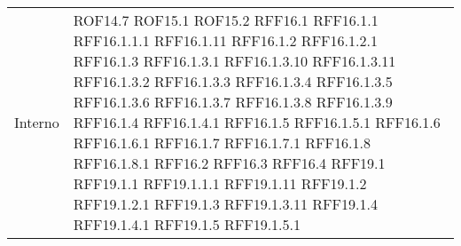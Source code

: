 \begin{longtable}{p{2.5cm}!{\VRule[1pt]}p{2.5cm}}
	Interno & ROF14.7 \newline ROF15.1 \newline ROF15.2 \newline RFF16.1 \newline RFF16.1.1 \newline RFF16.1.1.1 \newline RFF16.1.11 \newline RFF16.1.2 \newline RFF16.1.2.1 \newline RFF16.1.3 \newline RFF16.1.3.1 \newline RFF16.1.3.10 \newline RFF16.1.3.11 \newline RFF16.1.3.2 \newline RFF16.1.3.3 \newline RFF16.1.3.4 \newline RFF16.1.3.5 \newline RFF16.1.3.6 \newline RFF16.1.3.7 \newline RFF16.1.3.8 \newline RFF16.1.3.9 \newline RFF16.1.4 \newline RFF16.1.4.1 \newline RFF16.1.5 \newline RFF16.1.5.1 \newline RFF16.1.6 \newline RFF16.1.6.1 \newline RFF16.1.7 \newline RFF16.1.7.1 \newline RFF16.1.8 \newline RFF16.1.8.1 \newline RFF16.2 \newline RFF16.3 \newline RFF16.4 \newline RFF19.1 \newline RFF19.1.1 \newline RFF19.1.1.1 \newline RFF19.1.11 \newline RFF19.1.2 \newline RFF19.1.2.1 \newline RFF19.1.3 \newline RFF19.1.3.11 \newline RFF19.1.4 \newline RFF19.1.4.1 \newline RFF19.1.5 \newline RFF19.1.5.1 \\

\end{longtable}
